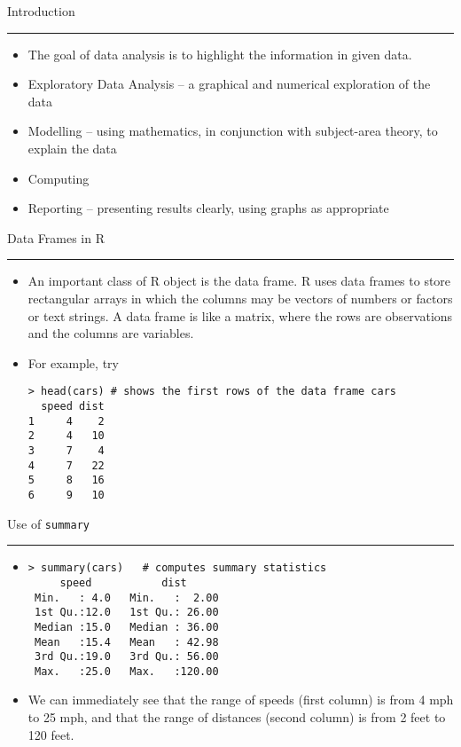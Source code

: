 \documentclass[landscape]{slides}
\newcommand{\red}[0]{\color{Red}}
\newcommand{\blue}[0]{\color{Blue}}
\newcommand{\header}[1]{
    \red
    #1\\
    \rule[1in]{\textwidth}{.01in}
    \vspace{-1.5in}
    \blue
}
\begin{document}

\begin{slide}
\header{Introduction}
\begin{itemize} 
\item The goal of data analysis is to highlight the information 
in given data. 
\item Exploratory Data Analysis -- a graphical and
numerical exploration of the  data 
\item Modelling -- using
mathematics, in conjunction with subject-area theory, 
to explain the data
\item Computing 
\item Reporting -- presenting results clearly, using 
graphs as appropriate
\end{itemize} 
\end{slide}

\begin{slide}
\header{Data Frames in R} 
\begin{itemize}
\item
An important class of R object is the data frame. R uses data 
frames to
store rectangular arrays in which the columns may be vectors of
numbers or factors or text strings.  A
data frame is like a matrix, where the rows are observations
and the columns are variables.
\item 
For example, try
\begin{verbatim}
> head(cars) # shows the first rows of the data frame cars
  speed dist
1     4    2
2     4   10
3     7    4
4     7   22
5     8   16
6     9   10
\end{verbatim}
\end{itemize}
\end{slide}

\begin{slide}
\header{Use of \texttt{summary}}
\begin{itemize}
\item 
\begin{verbatim}
> summary(cars)   # computes summary statistics
     speed           dist
 Min.   : 4.0   Min.   :  2.00
 1st Qu.:12.0   1st Qu.: 26.00
 Median :15.0   Median : 36.00
 Mean   :15.4   Mean   : 42.98
 3rd Qu.:19.0   3rd Qu.: 56.00
 Max.   :25.0   Max.   :120.00
\end{verbatim}
\item We can immediately see that the range of speeds (first 
column)
is from 4 mph to 25 mph, and that the range of distances (second
column) is from 2 feet to 120 feet.
\end{itemize}
\end{slide}
\end{document}
